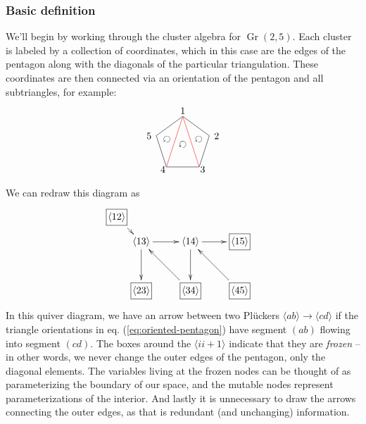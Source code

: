 \documentclass[11pt]{article}
\DeclareMathOperator{\Gr}{Gr}
\def\ket#1{\langle #1 \rangle}
\def\drawLabeledPentagon{
\coordinate (P1) at (90:1);
\coordinate (P2) at (18:1);
\coordinate (P3) at (306:1);
\coordinate (P4) at (234:1);
\coordinate (P5) at (162:1);
\draw (P1) -- (P2) -- (P3) -- (P4) -- (P5) -- cycle;
\draw (0,1.2) node {1};
\draw (1,.3) node[anchor=west] {2};
\draw (.5,-.9) node[anchor=west] {3};
\draw (-.5,-.9) node[anchor=east] {4};
\draw (-1,.3) node[anchor=east] {5};
}
\begin{document}
\subsubsection*{Basic definition}

We'll begin by working through the cluster algebra for $\Gr(2,5)$. Each cluster is labeled by a collection of coordinates, which in this case are the edges of the pentagon along with the diagonals of the particular triangulation. These coordinates are then connected via an orientation of the pentagon and all subtriangles, for example:
\begin{equation}\label{eq:oriented-pentagon}
\begin{gathered}
\begin{tikzpicture}
  \drawLabeledPentagon
  \draw[color=red] (P1) -- (P3);
  \draw[color=red] (P1) -- (P4);
  \draw (18:.6) node[rotate=144] {$\circlearrowleft$};
  \draw (0:0) node[rotate=144] {$\circlearrowleft$};
  \draw (162:.6) node[rotate=144] {$\circlearrowleft$};
\end{tikzpicture} 
\end{gathered}
\end{equation}
We can redraw this diagram as
\begin{equation}\label{eq:gr25-seed}
\begin{gathered}
\begin{xy} 0;<1pt,0pt>:<0pt,-1pt>::
	(25,25) *+{\langle 13\rangle} ="0",
	(75,25) *+{\langle 14\rangle} ="1",
	(125,25) *+{\framebox[5ex]{$\langle 15\rangle$}} ="2",
	(125,75) *+{\framebox[5ex]{$\langle 45\rangle$}} ="3",
	(75,75) *+{\framebox[5ex]{$\langle 34\rangle$}} ="4",
	(25,75) *+{\framebox[5ex]{$\langle 23\rangle$}} ="5",
	(0,0) *+{\framebox[5ex]{$\langle 12\rangle$}} ="6",
	(145,75) *+{},
	"0", {\ar"1"},
	"4", {\ar"0"},
	"0", {\ar"5"},
	"6", {\ar"0"},
	"1", {\ar"2"},
	"3", {\ar"1"},
	"1", {\ar"4"},
\end{xy}
\end{gathered}
\end{equation}
In this quiver diagram, we have an arrow between two Pl\"uckers $\ket{ab} \to \ket{cd}$ if the triangle orientations in eq. (\ref{eq:oriented-pentagon}) have segment $(ab)$ flowing into segment $(cd)$. The boxes around the $\ket{ii+1}$ indicate that they are \emph{frozen} -- in other words, we never change the outer edges of the pentagon, only the diagonal elements. The variables living at the frozen nodes can be thought of as parameterizing the boundary of our space, and the mutable nodes represent parameterizations of the interior. And lastly it is unnecessary to draw the arrows connecting the outer edges, as that is redundant (and unchanging) information. 
\end{document}
